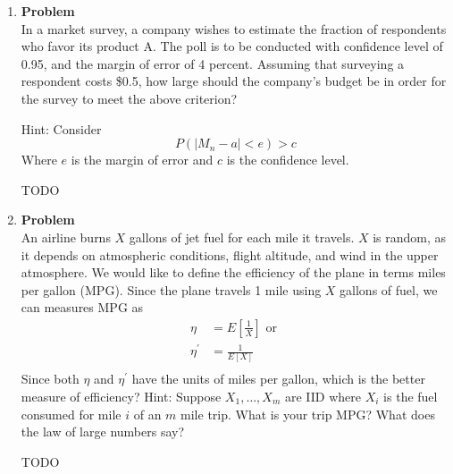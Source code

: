 \documentclass[12pt]{article}
\newenvironment{Ex}{\textbf{Problem}\vspace{.75em}\\}{}
\begin{document}
\begin{enumerate}
\item
  \begin{Ex}
    In a market survey, a company wishes to estimate the fraction of
    respondents who favor its product A. The poll is to be conducted
    with confidence level of 0.95, and the margin of error of 4
    percent. Assuming that surveying a respondent costs \$0.5, how
    large should the company’s budget be in order for the survey to
    meet the above criterion?

    Hint: Consider
    \begin{equation}
      \label{eq:5-hint}
      P(|M_n-a|<e)>c
    \end{equation}
    Where $e$ is the margin of error and $c$ is the confidence level.
    \begin{solution} \hfill
      {\color{red} \huge TODO}
    \end{solution}
  \end{Ex}

\item
  \begin{Ex}
    An airline burns $X$ gallons of jet fuel for each mile it travels. $X$
    is random, as it depends on atmospheric conditions, flight
    altitude, and wind in the upper atmosphere. We would like to
    define the efficiency of the plane in terms miles per gallon
    (MPG). Since the plane travels 1 mile using $X$ gallons of fuel, we
    can measures MPG as
    \begin{equation}
      \label{eq:6-mpg}
      \begin{aligned}
        \eta &= E\left[\frac{1}{X}\right] \text{ or } \\
        \eta^\prime &= \frac{1}{E[X]} \\
      \end{aligned}
    \end{equation}
    Since both $\eta$ and $\eta^\prime$ have the units of miles per gallon,
    which is the better measure of efficiency? Hint: Suppose
    $X_1,\ldots,X_m$ are IID where $X_i$ is the fuel consumed for mile
    $i$ of an $m$ mile trip. What is your trip MPG? What does the law
    of large numbers say?
    \begin{solution} \hfill
      {\color{red} \huge TODO}
    \end{solution}
  \end{Ex}


\end{enumerate}
\end{document}
